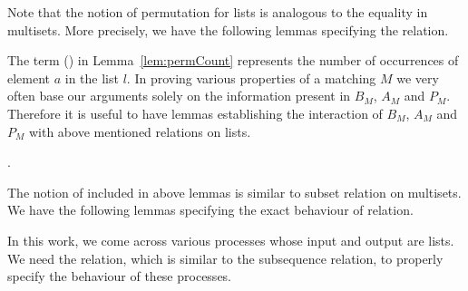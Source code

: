 \documentclass[a4paper,UKenglish,cleveref, autoref]{lipics-v2019}
\begin{document}
Note that the notion of permutation for lists is analogous to the equality in multisets. More precisely, we have the following lemmas specifying the  relation.

\begin{lemma}\label{lem:permCount} 
\end{lemma}
\begin{lemma}
\end{lemma}

The term (\emph{}) in Lemma~\ref{lem:permCount}  represents the number of occurrences of element $a$ in the list $l$. In proving various properties of a matching $M$ we very often base our arguments solely on the information present in $B_M$, $A_M$ and $P_M$. Therefore it is useful to have lemmas establishing the interaction of  $B_M$, $A_M$ and $P_M$ with above mentioned relations on lists. 

\begin{lemma}
.
\end{lemma}
\begin{lemma}
\end{lemma}

The notion of included in above lemmas is similar to subset relation on multisets. We have the following lemmas specifying the exact behaviour of  relation.
\begin{lemma}
\end{lemma}
\begin{lemma}
\end{lemma}

In this work, we come across various processes whose input and output are lists. We need the  relation, which is similar to the subsequence relation, to properly specify the behaviour of these processes.  

\begin{lemma} 
\end{lemma}
\begin{lemma}\label{lem:sublistInd} 
\end{lemma}
\end{document}
